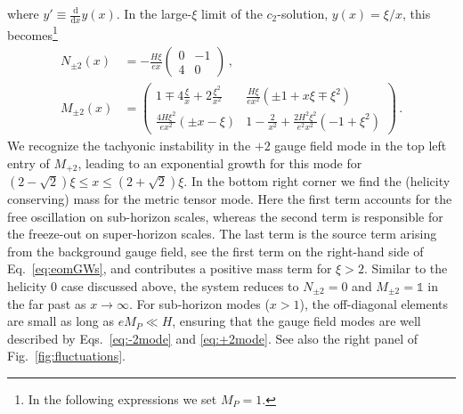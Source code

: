 where $y' \equiv \tfrac{\textrm{d} }{\textrm{d}x} y(x) $.
In the large-$\xi$ limit of the $c_2$-solution, $y(x) = \xi/x$, this becomes\footnote{In the following expressions we set $M_P = 1$.}
\begin{align}
 N_{\pm 2}(x) &  =  - \frac{ H \xi }{e x} \begin{pmatrix}
                    0 & -1 \\
                   4  & 0
                   \end{pmatrix} \,, \\
M_{\pm 2}(x) & = \begin{pmatrix} 
               1 \mp 4 \frac{\xi}{x} + 2 \frac{\xi^2}{x^2} & \frac{H \xi}{e x^2} \left( \pm 1 + x \xi \mp \xi^2 \right) \\
              \frac{4 H \xi^2}{e x^2 } \left(\pm x - \xi \right) &
                1 - \frac{2}{x^2}  + \frac{2 H^2 \xi^2}{ e^2 x^2} (-1 + \xi^2)
                 \end{pmatrix} \,.
\end{align}
We recognize the tachyonic instability in the $+2$ gauge field mode in the top left entry of $M_{+2}$, leading to an exponential growth for this mode for $(2-\sqrt{2})\xi \leq x \leq (2+\sqrt{2}) \xi$. In the bottom right corner we find the (helicity conserving) mass for the metric tensor mode. Here the first term accounts for the free oscillation on sub-horizon scales, whereas the second term is responsible for the freeze-out on super-horizon scales. The last term is the source term arising from the background gauge field, see the first term on the right-hand side of Eq.~\eqref{eq:eomGWs}, and contributes a positive mass term for $\xi > 2$. Similar to the helicity 0 case discussed above, the system reduces to $N_{\pm2} = 0$ and $M_{\pm2} = \mathbb{1}$ in the far past as $x \rightarrow \infty$. For sub-horizon modes ($x > 1$), the off-diagonal elements are small as long as $e M_P \ll  H$, ensuring that the gauge field modes are well described by Eqs.~\eqref{eq:-2mode} and \eqref{eq:+2mode}. See also the right panel of Fig.~\ref{fig:fluctuations}.

